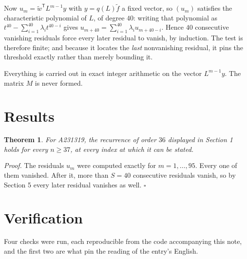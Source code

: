 \documentclass[11pt]{article}
\newtheorem{theorem}{Theorem}
\theoremstyle{definition}
\begin{document}
Now $u_m = \tilde w^{\mathsf T} L^{m-1} y$ with $y = q(L)\tilde f$ a fixed vector, so $(u_m)$ satisfies the characteristic polynomial of $L$, of degree $40$: writing that polynomial as $t^{40} - \sum_{i=1}^{40} \lambda_i t^{40-i}$ gives $u_{m+40} = \sum_{i=1}^{40} \lambda_i u_{m+40-i}$. Hence $40$ consecutive vanishing residuals force every later residual to vanish, by induction. The test is therefore finite; and because it locates the {\itshape last} nonvanishing residual, it pins the threshold exactly rather than merely bounding it.

Everything is carried out in exact integer arithmetic on the vector $L^{m-1}y$. The matrix $M$ is never formed.

\section{Results}

\begin{theorem} For A231319, the recurrence of order $36$ displayed in Section 1 holds for every $n \ge 37$, at every index at which it can be stated.\end{theorem}

{\itshape Proof.} The residuals $u_m$ were computed exactly for $m = 1,\dots,95$. Every one of them vanished. After it, more than $S = 40$ consecutive residuals vanish, so by Section 5 every later residual vanishes as well. $\square$

\section{Verification}

Four checks were run, each reproducible from the code accompanying this note, and the first two are what pin the reading of the entry's English.
\end{document}
